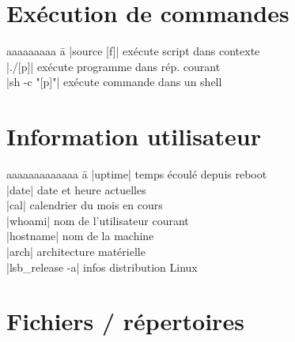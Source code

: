 \documentclass{article}
\begin{document}
\begin{multicols}{4}
    \section*{Exécution de commandes}
    \begin{tabbing}
        aaaaaaaaa \= a \kill
        \code|source [f]| \> exécute script dans contexte \\
        \code|./[p]| \> exécute programme dans rép. courant \\
        \code|sh -c "[p]"| \> exécute commande dans un shell
    \end{tabbing}

    \section*{Information utilisateur}
    \begin{tabbing}
        aaaaaaaaaaaaa \= a \kill
        \code|uptime| \> temps écoulé depuis reboot \\
        \code|date| \> date et heure actuelles \\
        \code|cal| \> calendrier du mois en cours \\
        \code|whoami| \> nom de l'utilisateur courant \\
        \code|hostname| \> nom de la machine \\
        \code|arch| \> architecture matérielle \\
        \code|lsb_release -a| \> infos distribution Linux \\
    \end{tabbing}

    \section*{Fichiers / répertoires}


\end{multicols}
\end{document}
